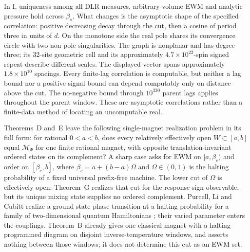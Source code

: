 In I, uniqueness among all DLR measures, arbitrary-volume EWM and analytic pressure hold across \(\beta_\star\). What changes is the asymptotic shape of the specified correlation: positive decreasing decay through the cut, then a cosine of period three in units of \(d\). On the monotone side the real pole shares its convergence circle with two non-pole singularities. The graph is nonplanar and has degree three; its 32-site geometric cell and its approximately \(4.7\times10^{22}\)-spin signed repeat describe different scales. The displayed vector spans approximately \(1.8\times10^{10}\) spacings. Every finite-lag correlation is computable, but neither a lag bound nor a positive signal bound can depend computably only on distance above the cut. The no-negative bound through \(10^{330}\) parent lags applies throughout the parent window. These are asymptotic correlations rather than a finite-data method of locating an uncomputable real.

Theorems~D and~E leave the following single-magnet realization problem in its full form: for rational \(0<a<b\), does every relatively effectively open \(W\subset[a,b]\) equal \(\mathcal M_\Phi\) for one finite rational magnet, with opposite translation-invariant ordered states on its complement? A sharp case asks for EWM on \([a,\beta_c)\) and order on \([\beta_c,b]\), where \(\beta_c=a+(b-a)\Omega\) and \(\Omega\in(0,1)\) is the halting probability of a fixed universal prefix-free machine. The lower cut of \(\Omega\) is effectively open. Theorem~G realizes that cut for the response-sign observable, but its unique mixing state supplies no ordered complement. Purcell, Li and Cubitt realize a ground-state phase transition at a halting probability for a family of two-dimensional quantum Hamiltonians \cite{plc}; their varied parameter enters the couplings. Theorem~B already gives one classical magnet with a halting-programmed diagram on disjoint inverse-temperature windows, and asserts nothing between those windows; it does not determine this cut as an EWM set.

